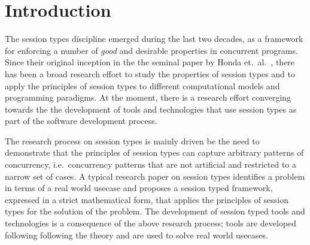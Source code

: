 \section{Introduction}

The session types discipline emerged during the last
two decades, as a framework for enforcing a number
of {\em good} and desirable properties in concurrent
programs.
Since their original inception in the the seminal paper by
Honda et.~al.~\cite{honda.vasconcelos.kubo:language-primitives},
there has been a broad research effort to study the properties
of session types and to apply the principles of session types
to different computational models and programming paradigms. 
At the moment, there is a research effort converging towards
the the development of tools and technologies that use session
types as part of the software development process.

The research process on session types is mainly driven
be the need to demonstrate that the principles of session types
can capture arbitrary patterns of concurrency,
i.e.~concurrency patterns that are not artificial and restricted
to a narrow set of cases.
A typical research paper on session types identifies a problem
in terms of a real world usecase and proposes a session typed
framework, expressed in a strict mathematical form, that applies
the principles of session types for the solution of the problem.
The development of session typed tools and technologies is a
consequence of the above research process; tools are developed
following following the theory and are used to solve real
world usecases.

